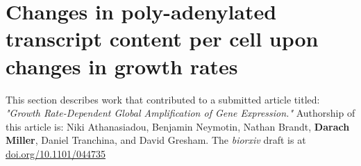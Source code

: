 %

%
%
%
\section{Changes in poly-adenylated transcript content per cell 
upon changes in growth rates}
%
%
%

This section describes work that contributed to a submitted article 
titled:
\textit{"Growth Rate-Dependent Global Amplification of Gene Expression."}
Authorship of this article is: 
Niki Athanasiadou, Benjamin Neymotin, Nathan Brandt, 
\textbf{Darach Miller}, Daniel Tranchina, and David Gresham.
The \textit{biorxiv} draft is at \url{doi.org/10.1101/044735}

